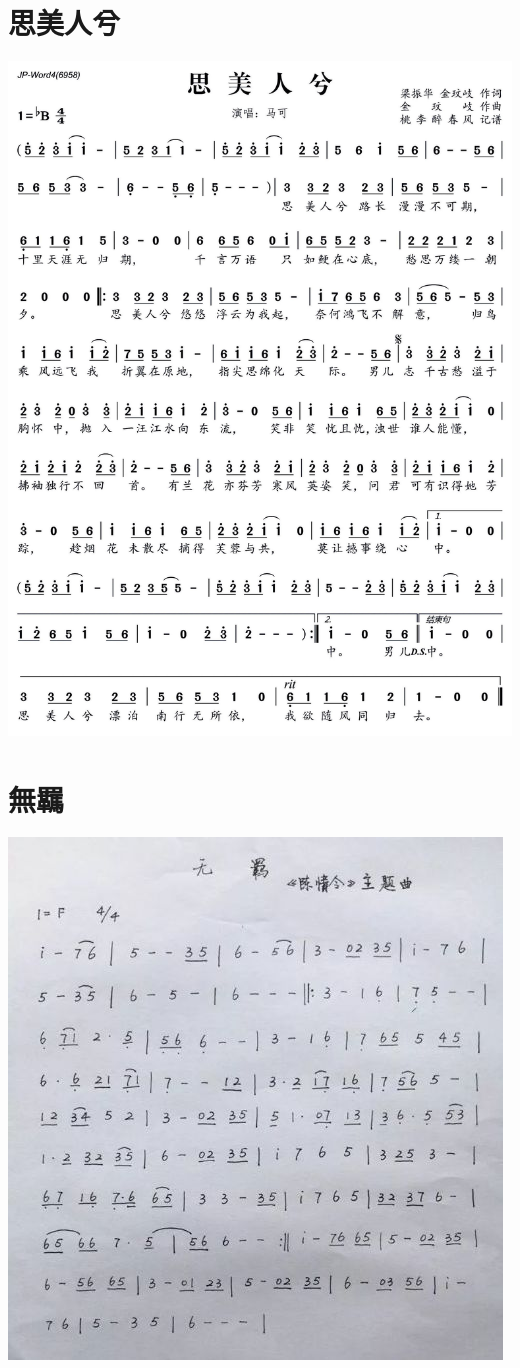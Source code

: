 \documentclass[cn,pad,twocol]{elegantbook}
\begin{document}
\section{思美人兮}  \includegraphics[width=\textwidth]{dongxiao/20200402-思美人.jpg}
\section{無羈}      \includegraphics[width=\textwidth]{dongxiao/20201231-無羈} 
\end{document}
